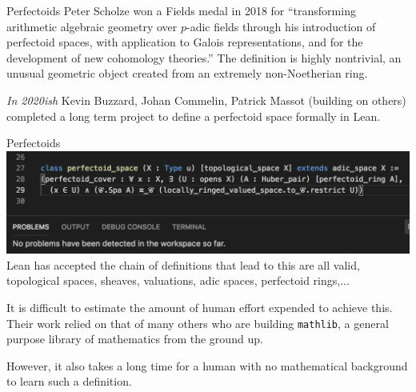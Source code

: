 


\begin{frame}{Perfectoids}
    Peter Scholze won a Fields medal in 2018 for ``transforming arithmetic algebraic geometry over $p$-adic fields through his introduction of perfectoid spaces, with application to Galois representations, and for the development of new cohomology theories.''
    \pause
    The definition is highly nontrivial, an unusual geometric object created from an extremely non-Noetherian ring.
    \pause

    \emph{In 2020ish} Kevin Buzzard, Johan Commelin, Patrick Massot  (building on others)  completed a long term project to define a perfectoid space formally in Lean.
\end{frame}

\begin{frame}{Perfectoids}
    \includegraphics[width=\textwidth]{perfectoid.png}
    Lean has accepted the chain of definitions that lead to this are all valid, topological spaces, sheaves, valuations, adic spaces, perfectoid rings,...
    \pause

    It is difficult to estimate the amount of human effort expended to achieve this. \pause
    Their work relied on that of many others who are building \texttt{mathlib}, a general purpose library of mathematics from the ground up. \pause

    However, it also takes a long time for a human with no mathematical background to learn such a definition.
\end{frame}

